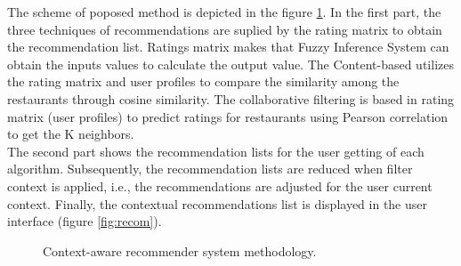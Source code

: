 The scheme of poposed method is depicted in the figure
\ref{fig:archit}.  In the first part, the three techniques of
recommendations are suplied by the rating matrix to obtain the
recommendation list. Ratings matrix makes that Fuzzy Inference System
can obtain the inputs values to calculate the output value. The
Content-based utilizes the rating matrix and user profiles to compare
the similarity among the restaurants through cosine similarity. The
collaborative filtering is based in rating matrix (user profiles) to
predict ratings for restaurants using Pearson correlation to get the K
neighbors.\\ 
The second part shows the recommendation lists for the user getting of
each algorithm. Subsequently, the recommendation lists are reduced
when filter context is applied, i.e., the recommendations are adjusted
for the user current context. Finally, the contextual recommendations
list is displayed in the user interface (figure \ref{fig:recom}).
\begin{figure}
\centering 
{}
\caption{Context-aware recommender system methodology.}
\label{fig:archit}       %
\end{figure}





